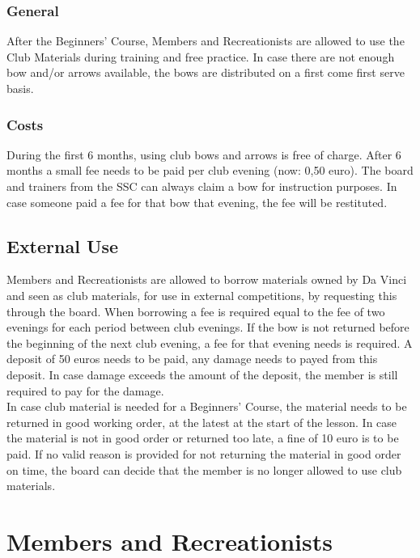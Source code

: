 \documentclass[a4paper]{article}
\begin{document}
\subsubsection{General}
After the { Beginners' Course}, { Members} and { Recreationists} are allowed to use the Club Materials during training and free practice. In case there are not enough bow and/or arrows available, the bows are distributed on a first come first serve basis.

\subsubsection{Costs}
During the first 6 months, using club bows and arrows is free of charge. After 6 months a small fee needs to be paid per club evening (now: 0,50 euro). The board and trainers from the { SSC} can always claim a bow for instruction purposes. In case someone paid a fee for that bow that evening, the fee will be restituted.

\subsection{External Use}
{ Members} and { Recreationists} are allowed to borrow materials owned by Da Vinci and seen as { club materials}, for use in external competitions, by requesting this through the board. When borrowing a fee is required equal to the fee of two evenings for each period between club evenings. If the bow is not returned before the beginning of the next club evening, a fee for that evening needs is required. A deposit of 50 euros needs to be paid, any damage needs to payed from this deposit. In case damage exceeds the amount of the deposit, the member is still required to pay for the damage. \\

In case { club material} is needed for a { Beginners' Course}, the material needs to be returned in good working order, at the latest at the start of the lesson. In case the material is not in good order or returned too late, a fine of 10 euro is to be paid. If no valid reason is provided for not returning the material in good order on time, the board can decide that the member is no longer allowed to use { club materials}.

\section{Members and Recreationists}
\end{document}
